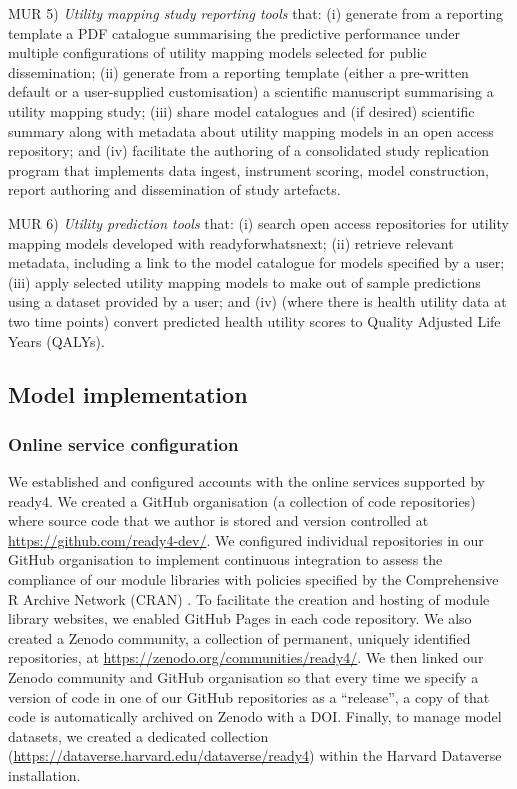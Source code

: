 \documentclass[sn-vancouver,Numbered,pdflatex]{sn-jnl}
\theoremstyle{remark}
\theoremstyle{definition}
\begin{document}
MUR 5) \emph{Utility mapping study reporting tools} that: (i) generate from a reporting template a PDF catalogue summarising the predictive performance under multiple configurations of utility mapping models selected for public dissemination; (ii) generate from a reporting template (either a pre-written default or a user-supplied customisation) a scientific manuscript summarising a utility mapping study; (iii) share model catalogues and (if desired) scientific summary along with metadata about utility mapping models in an open access repository; and (iv) facilitate the authoring of a consolidated study replication program that implements data ingest, instrument scoring, model construction, report authoring and dissemination of study artefacts.

MUR 6) \emph{Utility prediction tools} that: (i) search open access repositories for utility mapping models developed with readyforwhatsnext; (ii) retrieve relevant metadata, including a link to the model catalogue for models specified by a user; (iii) apply selected utility mapping models to make out of sample predictions using a dataset provided by a user; and (iv) (where there is health utility data at two time points) convert predicted health utility scores to Quality Adjusted Life Years (QALYs).

\hypertarget{model-implementation}{%
\subsection{Model implementation}\label{model-implementation}}

\hypertarget{online-service-configuration}{%
\subsubsection{Online service configuration}\label{online-service-configuration}}

We established and configured accounts with the online services supported by ready4. We created a GitHub organisation (a collection of code repositories) where source code that we author is stored and version controlled at \url{https://github.com/ready4-dev/}. We configured individual repositories in our GitHub organisation to implement continuous integration to assess the compliance of our module libraries with policies specified by the Comprehensive R Archive Network (CRAN) \citep{CRAN2022}. To facilitate the creation and hosting of module library websites, we enabled GitHub Pages in each code repository. We also created a Zenodo community, a collection of permanent, uniquely identified repositories, at \url{https://zenodo.org/communities/ready4/}. We then linked our Zenodo community and GitHub organisation so that every time we specify a version of code in one of our GitHub repositories as a ``release'', a copy of that code is automatically archived on Zenodo with a DOI. Finally, to manage model datasets, we created a dedicated collection (\url{https://dataverse.harvard.edu/dataverse/ready4}) within the Harvard Dataverse installation.
\end{document}
